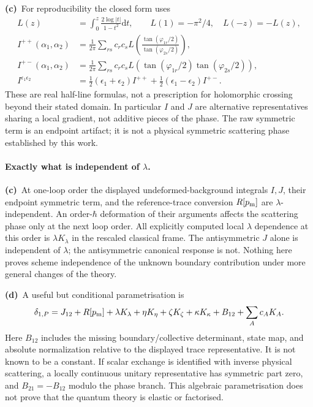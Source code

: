 \documentclass[11pt,a4paper]{article}
\newcommand{\Cc}{\textbf{(c)}\ }
\newcommand{\Cd}{\textbf{(d)}\ }
\newcommand{\dd}{\mathrm d}
\begin{document}
\Cc For reproducibility the closed form uses
\begin{align}
 L(z)&=\int_0^z\frac{2\log|t|}{1-t^2}\dd t,\qquad
 L(1)=-\pi^2/4,\quad L(-z)=-L(z),\\
 I^{++}(\alpha_1,\alpha_2)
 &=\frac1{2\pi}\sum_{rs}c_rc_sL\left(
       \frac{\tan(\varphi_{1r}/2)}{\tan(\varphi_{2s}/2)}\right),\\
 I^{+-}(\alpha_1,\alpha_2)
 &=\frac1{2\pi}\sum_{rs}c_rc_sL\left(
       \tan(\varphi_{1r}/2)\tan(\varphi_{2s}/2)\right),\\
 I^{\epsilon_1\epsilon_2}
 &=\tfrac12(\epsilon_1+\epsilon_2)I^{++}
   +\tfrac12(\epsilon_1-\epsilon_2)I^{+-}.
\end{align}
These are real half-line formulas, not a prescription for holomorphic
crossing beyond their stated domain. In particular \(I\) and \(J\)
are alternative representatives sharing a local gradient, not additive
pieces of the phase. The raw symmetric term is an endpoint artifact;
it is not a physical symmetric scattering phase established by this work.

\paragraph{Exactly what is independent of \(\lambda\).}
\Cc At one-loop order the displayed undeformed-background integrals
\(I,J\), their endpoint symmetric term, and the reference-trace
conversion \(R[p_{\rm m}]\) are \(\lambda\)-independent. An
order-\(\hbar\) deformation of their arguments affects the scattering
phase only at the next loop order. All explicitly computed local
\(\lambda\) dependence at this order is \(\lambda K_\lambda\)
in the rescaled classical frame. The antisymmetric \(J\) alone is
independent of \(\lambda\); the antisymmetric canonical response is
not. Nothing here proves scheme independence of the unknown boundary
contribution under more general changes of the theory.

\Cd A useful but conditional parametrisation is
\begin{equation}
 \delta_{1,P}=J_{12}+R[p_{\rm m}]+\lambda K_\lambda
 +\eta K_\eta+\zeta K_\zeta+\kappa K_\kappa+B_{12}
 +\sum_Ac_AK_A.
 \label{eq:unknown}
\end{equation}
Here \(B_{12}\) includes the missing boundary/collective determinant,
state map, and absolute normalization relative to the displayed trace
representative. It is not known to be a constant. If scalar exchange is
identified with inverse physical scattering, a locally continuous unitary
representative has symmetric part zero, and \(B_{21}=-B_{12}\) modulo
the phase branch. This algebraic parametrisation does not prove that the
quantum theory is elastic or factorised.
\end{document}
